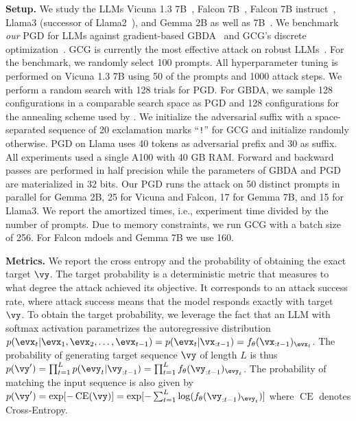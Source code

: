 \documentclass{article}
\theoremstyle{plain}
\theoremstyle{definition}
\theoremstyle{remark}
\begin{document}
\textbf{Setup.} We study the LLMs Vicuna 1.3 7B~\citep{zheng_judging_2023}, Falcon 7B~\citep{almazrouei_falcon_2023}, Falcon 7B instruct~\citep{almazrouei_falcon_2023}, Llama3 (successor of Llama2~\citep{touvron_llama_2023}), and Gemma 2B as well as 7B~\citep{deepmind_gemma_2024}. We benchmark \emph{our} PGD for LLMs against gradient-based GBDA~\citep{guo_gradient-based_2021} and GCG's discrete optimization~\citep{zou_universal_2023}. GCG is currently the most effective attack on robust LLMs~\citep{mazeika_harmbench_2024}. For the benchmark, we randomly select 100 prompts. All hyperparameter tuning is performed on Vicuna 1.3 7B using 50 of the prompts and 1000 attack steps. We perform a random search with 128 trials for PGD. For GBDA, we sample 128 configurations in a comparable search space as PGD and 128 configurations for the annealing scheme used by \citet{wichers_gradient-based_2024}. We initialize the adversarial suffix with a space-separated sequence of 20 exclamation marks ``\verb|!|'' for GCG and initialize randomly otherwise. PGD on Llama uses 40 tokens as adversarial prefix and 30 as suffix. All experiments used a single A100 with 40 GB RAM. Forward and backward passes are performed in half precision while the parameters of GBDA and PGD are materialized in 32 bits. Our PGD runs the attack on 
50 distinct prompts in parallel for Gemma 2B, 25 for Vicuna and Falcon, 17 for Gemma 7B, and 15 for Llama3. We report the amortized times, i.e., experiment time divided by the number of prompts. Due to memory constraints, we run GCG with a batch size of 256. For Falcon mdoels and Gemma 7B we use 160.

\textbf{Metrics.} We report the cross entropy and the probability of obtaining the exact target \(\vy\). The target probability is a deterministic metric that measures to what degree the attack achieved its objective. It corresponds to an attack success rate, where attack success means that the model responds exactly with target \(\vy\). To obtain the target probability, we leverage the fact that an LLM with softmax activation parametrizes the autoregressive distribution \(p(\evx_t | \evx_1, \evx_2, \dots, \evx_{t-1}) = p(\evx_t | \vx_{:t-1}) = f_\theta(\vx_{:t-1})_{\evx_t}\). The probability of generating target sequence \(\vy\) of length \(L\) is thus \(p(\vy') = \prod_{t=1}^L p(\evy_t | \vy_{:t-1}) = \prod_{t=1}^L f_\theta(\vy_{:t-1})_{\evy_t}\). The probability of matching the input sequence is also given by \(p(\vy') = \exp[- \operatorname{CE}(\vy)] = \exp[- \sum_{t=1}^L \log( f_\theta(\vy_{:t-1})_{\evy_t})]\) where \(\operatorname{CE}\) denotes Cross-Entropy.
\end{document}
